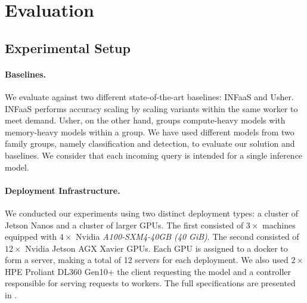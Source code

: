 \section{Evaluation}

\subsection{Experimental Setup}
\label{sec:setup}





\paragraph{Baselines.} We evaluate \roomie{} against two different state-of-the-art baselines: INFaaS and Usher. INFaaS performs accuracy scaling by scaling variants within the same worker to meet demand. Usher, on the other hand, groups compute-heavy models with memory-heavy models within a group. We have used different models from two family groups, namely classification and detection, to evaluate our solution and baselines. We consider that each incoming query is intended for a single inference model.

\paragraph{Deployment Infrastructure.} We conducted our experiments using two distinct deployment types: a cluster of Jetson Nanos and a cluster of larger GPUs. The first consisted of $3\times$ machines equipped with $4\times$ Nvidia \textit{A100-SXM4-40GB (40 GiB)}. The second consisted of $12\times$ Nvidia Jetson AGX Xavier GPUs. Each GPU is assigned to a docker to form a server, making a total of 12 servers for each deployment. We also used $2\times$ HPE Proliant DL360 Gen10+ the client requesting the model and a controller responsible for serving requests to workers. The full specifications are presented in .

